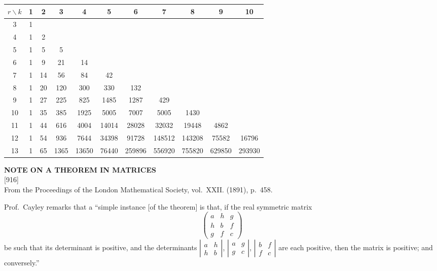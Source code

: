 \documentclass[11pt,a4paper]{article}
\newcommand{\paper}[4]{%
  \newpage
  \begin{center}
    {\large\bfseries #2}\\[0.5em]
    {\small [#1]}\\[0.3em]
    {\small #3}
  \end{center}
  \vspace{0.5em}
}
\begin{document}
\begin{center}
\small
\begin{tabular}{c|cccccccccc}
$r \backslash k$ & 1 & 2 & 3 & 4 & 5 & 6 & 7 & 8 & 9 & 10 \\
\hline
3 & 1 \\
4 & 1 & 2 \\
5 & 1 & 5 & 5 \\
6 & 1 & 9 & 21 & 14 \\
7 & 1 & 14 & 56 & 84 & 42 \\
8 & 1 & 20 & 120 & 300 & 330 & 132 \\
9 & 1 & 27 & 225 & 825 & 1485 & 1287 & 429 \\
10 & 1 & 35 & 385 & 1925 & 5005 & 7007 & 5005 & 1430 \\
11 & 1 & 44 & 616 & 4004 & 14014 & 28028 & 32032 & 19448 & 4862 \\
12 & 1 & 54 & 936 & 7644 & 34398 & 91728 & 148512 & 143208 & 75582 & 16796 \\
13 & 1 & 65 & 1365 & 13650 & 76440 & 259896 & 556920 & 755820 & 629850 & 293930 \\
\end{tabular}
\end{center}

\newpage
\paper{916}{NOTE ON A THEOREM IN MATRICES}{From the Proceedings of the London Mathematical Society, vol.~XXII. (1891), p.~458.}{}

Prof.~Cayley remarks that a ``simple instance [of the theorem] is that, if the real symmetric matrix
\[
\begin{pmatrix}
a & h & g \\
h & b & f \\
g & f & c
\end{pmatrix}
\]
be such that its determinant is positive, and the determinants $|\begin{smallmatrix} a & h \\ h & b \end{smallmatrix}|$, $|\begin{smallmatrix} a & g \\ g & c \end{smallmatrix}|$, $|\begin{smallmatrix} b & f \\ f & c \end{smallmatrix}|$ are each positive, then the matrix is positive; and conversely.''
\end{document}
